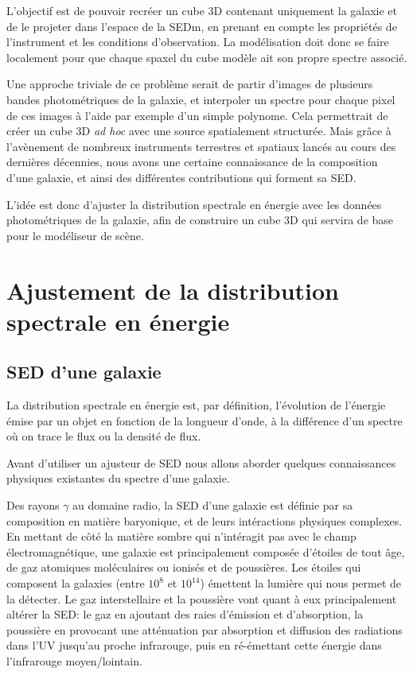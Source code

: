 \documentclass[../main/main.tex]{subfiles}
\begin{document}
L'objectif est de pouvoir recréer un cube
3D contenant uniquement la galaxie et de le projeter dans
l'espace de la SEDm, en prenant en compte les propriétés de l'instrument et les
conditions d'observation. 
La modélisation doit donc se faire localement pour
que chaque spaxel du cube modèle ait son propre spectre associé.

Une approche triviale de ce problème serait de partir d'images de
plusieurs bandes
photométriques de la galaxie, et interpoler un spectre pour chaque pixel
de ces images à l'aide par exemple d'un
simple polynome. Cela permettrait de créer un cube 3D \textit{ad hoc}
avec une source spatialement structurée.
Mais grâce à l'avènement de nombreux instruments terrestres et spatiaux
lancés au cours des dernières décennies, nous avons une certaine
connaissance de la composition d'une galaxie, et ainsi des différentes
contributions qui forment sa SED.

L'idée est donc d'ajuster la distribution spectrale en énergie avec les données
photométriques de la galaxie, afin de construire un cube 3D qui servira de base pour le modéliseur de scène.

\section{Ajustement de la distribution spectrale en énergie}\label{sec:sedfitting}
\subsection{SED d'une galaxie}

La distribution spectrale en énergie est, par définition, l'évolution de
l'énergie émise par un objet en fonction de la longueur d'onde, à la
différence d'un spectre où on trace le flux ou la densité de flux.

Avant d'utiliser un ajusteur de SED nous allons aborder
quelques connaissances physiques existantes du spectre d'une galaxie.

Des rayons $\gamma$ au domaine radio, la SED d'une galaxie est définie par sa composition en matière
baryonique, et de leurs intéractions physiques complexes. En mettant de côté la matière
sombre qui n'intéragit pas avec le champ électromagnétique, une galaxie
est principalement composée d'étoiles de tout âge, de gaz atomiques
moléculaires ou ionisés et de poussières. Les étoiles
qui composent la galaxies (entre $10^{8}$ et $10^{14}$) émettent la
lumière qui nous permet de la détecter. Le gaz interstellaire
et la poussière vont quant à eux principalement altérer la SED: le gaz en ajoutant des raies
d'émission et d'absorption, la poussière en provocant une atténuation par
absorption et diffusion des radiations dans l'UV jusqu'au proche infrarouge, puis en
ré-émettant cette énergie dans l'infrarouge moyen/lointain.
\end{document}
